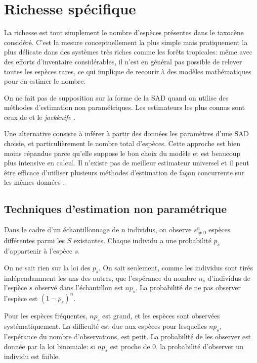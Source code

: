 \documentclass[
  11pt,
  french,
  a4paper,
  extrafontsizes,onecolumn,openright
  ]{memoir}
\begin{document}
\section{Richesse spécifique}\label{sec-Richesse}

La richesse est tout simplement le nombre d'espèces présentes dans le taxocène considéré.
C'est la mesure conceptuellement la plus simple mais pratiquement la plus délicate dans des systèmes très riches comme les forêts tropicales: même avec des efforts d'inventaire considérables, il n'est en général pas possible de relever toutes les espèces rares, ce qui implique de recourir à des modèles mathématiques pour en estimer le nombre.

On ne fait pas de supposition sur la forme de la SAD quand on utilise des méthodes d'estimation non paramétriques.
Les estimateurs les plus connus sont ceux de \textcite{Chao1984} et le \emph{jackknife} \autocite{Burnham1979}.

Une alternative consiste à inférer à partir des données les paramètres d'une SAD choisie, et particulièrement le nombre total d'espèces.
Cette approche est bien moins répandue parce qu'elle suppose le bon choix du modèle et est beaucoup plus intensive en calcul.
Il n'existe pas de meilleur estimateur universel \autocite{OHara2005} et il peut être efficace d'utiliser plusieurs méthodes d'estimation de façon concurrente sur les mêmes données \autocite{Basset2012}.

\subsection{Techniques d'estimation non paramétrique}\label{techniques-destimation-non-paramuxe9trique}

Dans le cadre d'un échantillonnage de \(n\) individus, on observe \(s^{n}_{\ne 0}\) espèces différentes parmi les \(S\) existantes.
Chaque individu a une probabilité \(p_s\) d'appartenir à l'espèce \(s\).

On ne sait rien sur la loi des \(p_s\).
On sait seulement, comme les individus sont tirés indépendamment les uns des autres, que l'espérance du nombre \(n_s\) d'individus de l'espèce \(s\) observé dans l'échantillon est \(np_s\).
La probabilité de ne pas observer l'espèce est \((1-p_s)^n\).

Pour les espèces fréquentes, \(np_s\) est grand, et les espèces sont observées systématiquement.
La difficulté est due aux espèces pour lesquelles \(np_s\), l'espérance du nombre d'observations, est petit.
La probabilité de les observer est donnée par la loi binomiale: si \(np_s\) est proche de 0, la probabilité d'observer un individu est faible.
\end{document}
